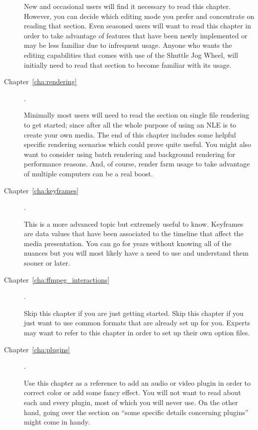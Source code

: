\begin{description}
        New and occasional users will find it necessary to read this chapter. However, you can decide which editing mode you prefer and concentrate on reading that section.
        Even seasoned users will want to read this chapter in order to take advantage of features that have been newly implemented or may be less familiar due to infrequent usage.
        Anyone who wants the editing capabilities that comes with use of the Shuttle Jog Wheel, will initially need to read that section to become familiar with its usage.

    \item[Chapter~\ref{cha:rendering}] .

        Minimally most users will need to read the section on single file rendering to get started; since after all the whole purpose of using an NLE is to create your own media.
        The end of this chapter includes some helpful specific rendering scenarios which could prove quite useful.
        You might also want to consider using batch rendering and background rendering for performance reasons.
        And, of course, render farm usage to take advantage of multiple computers can be a real boost.

    \item[Chapter~\ref{cha:keyframes}] .

        This is a more advanced topic but extremely useful to know.
        Keyframes are data values that have been associated to the timeline that affect the media presentation.
        You can go for years without knowing all of the nuances but you will most likely have a need to use and understand them sooner or later.

    \item[Chapter~\ref{cha:ffmpeg_interactions}] .

        Skip this chapter if you are just getting started. Skip this chapter if you just want to use common
        formats that are already set up for you. Experts may want to refer to this chapter in order to set up their
        own option files.

    \item[Chapter~\ref{cha:plugins}].

        Use this chapter as a reference to add an audio or video plugin in order to correct color or add some fancy effect.
        You will not want to read about each and every plugin, most of which you will never use.
        On the other hand, going over the section on “some specific details concerning plugins” might come in handy.


\end{description}
